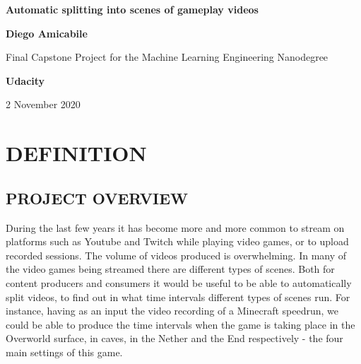 \documentclass[
]{article}
\author{}
\date{}
\newcommand{\hhref}[3][blue]{\href{#2}{\color{#1}{#3}}}%
\begin{document}
\begin{titlepage}
	\begin{center}
		\vspace*{1cm}
		
		\textbf{Automatic splitting into scenes of gameplay videos}
		
		\vspace{0.5cm}
		\hhref{https://github.com/diegoami/DA_ML_Capstone}{https://github.com/diegoami/DA\_ML\_Capstone}
		
		\vspace{1.5cm}
		
		\textbf{Diego Amicabile}
		
		\vfill
		
		Final Capstone Project for the Machine Learning Engineering Nanodegree
		\vspace{0.8cm}
	
		\textbf{Udacity}
		
		\vspace{0.8cm}
		

		2 November 2020
		
	\end{center}
\end{titlepage}

\hypertarget{definition}{%
\section{DEFINITION}\label{definition}}

\hypertarget{project-overview}{%
\subsection{PROJECT OVERVIEW}\label{project-overview}}

During the last few years it has become more and more common to stream
on platforms such as Youtube and Twitch while playing video games, or to
upload recorded sessions. The volume of videos produced is overwhelming.
In many of the video games being streamed there are different types of
scenes. Both for content producers and consumers it would be useful to
be able to automatically split videos, to find out in what time
intervals different types of scenes run. For instance, having as an
input the video recording of a Minecraft speedrun, we could be able to
produce the time intervals when the game is taking place in the
Overworld surface, in caves, in the Nether and the End respectively -
the four main settings of this game.
\end{document}
